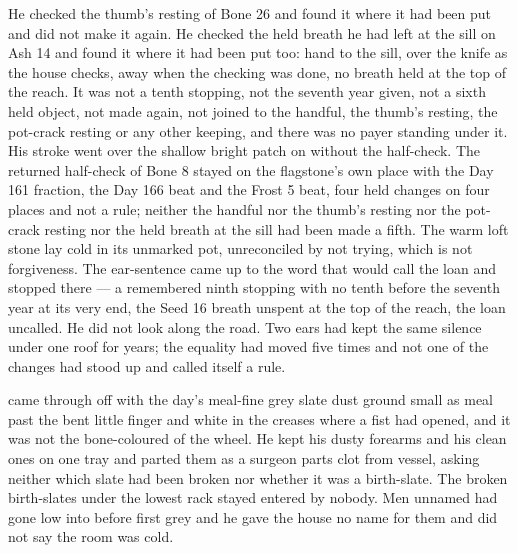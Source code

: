 He checked the thumb’s resting of Bone 26 and found it where it had been put and did not make it again. He checked the held breath he had left at the sill on Ash 14 and found it where it had been put too: hand to the sill, over the knife as the house checks, away when the checking was done, no breath held at the top of the reach. It was not a tenth stopping, not the seventh year given, not a sixth held object, not made again, not joined to the handful, the thumb’s resting, the pot-crack resting or any other keeping, and there was no payer standing under it. His stroke went over the shallow bright patch on  without the half-check. The returned half-check of Bone 8 stayed on the flagstone’s own place with the Day 161 fraction, the Day 166 beat and the Frost 5 beat, four held changes on four places and not a rule; neither the handful nor the thumb’s resting nor the pot-crack resting nor the held breath at the sill had been made a fifth. The warm loft stone lay cold in its unmarked pot, unreconciled by not trying, which is not forgiveness. The ear-sentence came up to the word that would call the loan and stopped there --- a remembered ninth stopping with no tenth before the seventh year at its very end, the Seed 16 breath unspent at the top of the reach, the loan uncalled. He did not look along the road. Two ears had kept the same silence under one roof for years; the equality had moved five times and not one of the changes had stood up and called itself a rule.

 came through  off  with the day’s meal-fine grey slate dust ground small as meal past the bent little finger and white in the creases where a fist had opened, and it was not the bone-coloured  of the wheel. He kept his dusty forearms and his clean ones on one tray and parted them as a surgeon parts clot from vessel, asking neither which slate had been broken nor whether it was a birth-slate. The broken birth-slates under the lowest rack stayed entered by nobody. Men unnamed had gone low into  before first grey and he gave the house no name for them and did not say the room was cold.

